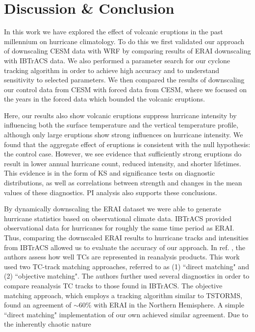\documentclass[phd,tocprelim]{cornell}
\begin{document}
\section{Discussion \& Conclusion}
\label{discuss}
In this work we have explored the effect of volcanic eruptions in 
the past millennium on hurricane climatology. To do this we first 
validated our approach of downscaling CESM data with WRF by comparing 
results of ERAI downscaling with IBTrACS data. We also performed a 
parameter search for our cyclone tracking algorithm in order to achieve 
high accuracy and to understand sensitivity to selected parameters. 
We then compared the results of downscaling our control data from CESM 
with forced data from CESM, where we focused on the years in the forced 
data which bounded the volcanic eruptions. 
\par
Here, our results also show volcanic eruptions suppress hurricane intensity by
influencing both the surface temperature and the vertical temperature
profile, although only large eruptions show strong influences on
hurricane intensity. We found that the aggregate effect of eruptions is 
consistent with the null hypothesis: the control case. However, we see evidence 
that sufficiently strong eruptions do result in lower annual hurricane count, 
reduced intensity, and shorter lifetimes. This evidence is in the form of 
KS and significance tests on diagnostic distributions, as well as 
correlations between strength and changes in the mean values of these diagnostics. PI analysis also supports these conclusions. 
\par
By dynamically downscaling the ERAI dataset we were able to generate 
hurricane statistics based on observational climate data. 
IBTrACS provided observational data for hurricanes for roughly the 
same time period as ERAI. Thus, comparing
the downscaled ERAI results to hurricane tracks and intensities from
IBTrACS allowed us to evaluate the accuracy of our approach. 
In ref. \cite{hodges2017well}, the authors assess how well TCs are
represented in reanalysis products. This work used two TC-track
matching approaches, referred to as (1) ``direct matching" and (2)
``objective matching". The authors further used several diagnostics in
order to compare reanalysis TC tracks to those found in IBTrACS. The
objective matching approach, which employs a tracking algorithm
similar to TSTORMS, found an agreement of ${\sim}60\%$ with ERAI in
the Northern Hemisphere. A simple ``direct matching" implementation of
our own achieved similar agreement. Due to the inherently chaotic nature 
\end{document}
